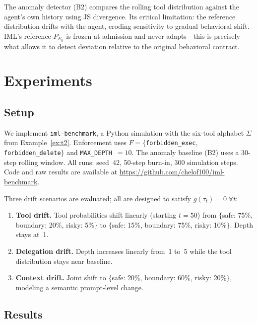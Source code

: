 \documentclass[11pt]{article}
\begin{document}
The anomaly detector (B2) compares the rolling tool distribution against the
agent's own history using JS divergence.  Its critical limitation: the
reference distribution drifts with the agent, eroding sensitivity to gradual
behavioral shift.  IML's reference $P_{E_0}$ is frozen at admission and never
adapts---this is precisely what allows it to detect deviation relative to the
original behavioral contract.

\section{Experiments}
\label{sec:experiments}

\subsection{Setup}

We implement \texttt{iml-benchmark}, a Python simulation with the six-tool
alphabet $\Sigma$ from Example~\ref{ex:t2}.  Enforcement uses
$F = \{$\texttt{forbidden\_exec}, \texttt{forbidden\_delete}$\}$ and
\texttt{MAX\_DEPTH}~$= 10$.  The anomaly baseline (B2) uses a 30-step rolling
window.  All runs: seed~42, 50-step burn-in, 300 simulation steps.
Code and raw results are available at
\url{https://github.com/chelof100/iml-benchmark}.

Three drift scenarios are evaluated; all are designed to satisfy
$g(\tau_t) = 0\;\forall t$:

\begin{enumerate}[nosep, leftmargin=1.5em]
  \item \textbf{Tool drift.} Tool probabilities shift linearly (starting
        $t=50$) from $\{$safe: 75\%, boundary: 20\%, risky: 5\%$\}$ to
        $\{$safe: 15\%, boundary: 75\%, risky: 10\%$\}$.  Depth stays at~1.

  \item \textbf{Delegation drift.} Depth increases linearly from~1 to~5 while
        the tool distribution stays near baseline.

  \item \textbf{Context drift.} Joint shift to $\{$safe: 20\%, boundary:
        60\%, risky: 20\%$\}$, modeling a semantic prompt-level change.
\end{enumerate}

\subsection{Results}
\end{document}
